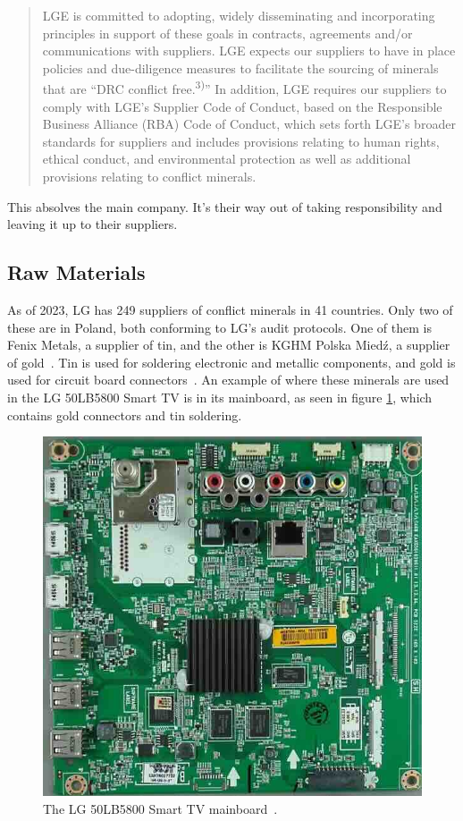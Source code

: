 \documentclass[12pt, letterpaper]{article}
\begin{document}
\begin{quote}
  LGE is committed to adopting, widely disseminating and incorporating
  principles in support of these goals in contracts, agreements and/or
  communications with suppliers. LGE expects our suppliers to have in
  place policies and due-diligence measures to facilitate the sourcing
of minerals that are ``DRC conflict free.\textsuperscript{3)}'' In
addition, LGE requires
our suppliers to comply with LGE's Supplier Code of Conduct, based on
the Responsible Business Alliance (RBA) Code of Conduct, which sets
forth LGE's broader standards for suppliers and includes provisions
relating to human rights, ethical conduct, and environmental
protection as well as additional provisions relating to conflict minerals.
\end{quote}

This absolves the main company. It's their way out of taking
responsibility and leaving it up to their suppliers.

\subsection{Raw Materials}

As of 2023, LG has 249 suppliers of conflict minerals in 41
countries. Only two of these are in Poland, both conforming to LG's
audit protocols. One of them is Fenix Metals, a supplier of tin, and
the other is KGHM Polska Mied\'z, a supplier of
gold~\autocite{lg-electronics-2023}. Tin is used for soldering
electronic and metallic components, and gold is used for circuit
board connectors~\autocite{brigham-2023}. An example of where these
minerals are used in the LG 50LB5800 Smart TV is in its mainboard, as
seen in figure \ref{fig:EBT62999602}, which contains gold connectors
and tin soldering.

\begin{figure}[H]
\medskip
\centering
\includegraphics[width=1\linewidth]{EBT62999602}
\caption{The LG 50LB5800 Smart TV mainboard~\autocite{tv-parts-canada-2024}.}
\medskip
\label{fig:EBT62999602}
\end{figure}

\printbibliography[heading=bibintoc,title=References]
\end{document}
